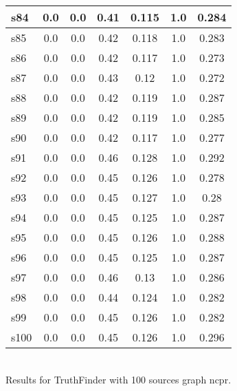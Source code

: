 \documentclass{article}
\begin{document}
\begin{tabular}{|l|c|c|c|c|c|c|}
\hline
s84 &0.0 & 0.0 & 0.41 & 0.115 & 1.0 & 0.284\\
\hline
s85 &0.0 & 0.0 & 0.42 & 0.118 & 1.0 & 0.283\\
\hline
s86 &0.0 & 0.0 & 0.42 & 0.117 & 1.0 & 0.273\\
\hline
s87 &0.0 & 0.0 & 0.43 & 0.12 & 1.0 & 0.272\\
\hline
s88 &0.0 & 0.0 & 0.42 & 0.119 & 1.0 & 0.287\\
\hline
s89 &0.0 & 0.0 & 0.42 & 0.119 & 1.0 & 0.285\\
\hline
s90 &0.0 & 0.0 & 0.42 & 0.117 & 1.0 & 0.277\\
\hline
s91 &0.0 & 0.0 & 0.46 & 0.128 & 1.0 & 0.292\\
\hline
s92 &0.0 & 0.0 & 0.45 & 0.126 & 1.0 & 0.278\\
\hline
s93 &0.0 & 0.0 & 0.45 & 0.127 & 1.0 & 0.28\\
\hline
s94 &0.0 & 0.0 & 0.45 & 0.125 & 1.0 & 0.287\\
\hline
s95 &0.0 & 0.0 & 0.45 & 0.126 & 1.0 & 0.288\\
\hline
s96 &0.0 & 0.0 & 0.45 & 0.125 & 1.0 & 0.287\\
\hline
s97 &0.0 & 0.0 & 0.46 & 0.13 & 1.0 & 0.286\\
\hline
s98 &0.0 & 0.0 & 0.44 & 0.124 & 1.0 & 0.282\\
\hline
s99 &0.0 & 0.0 & 0.45 & 0.126 & 1.0 & 0.282\\
\hline
s100 &0.0 & 0.0 & 0.45 & 0.126 & 1.0 & 0.296\\
\hline
\end{tabular}\\

\noindent Results for TruthFinder with 100 sources graph ncpr.
\end{document}
